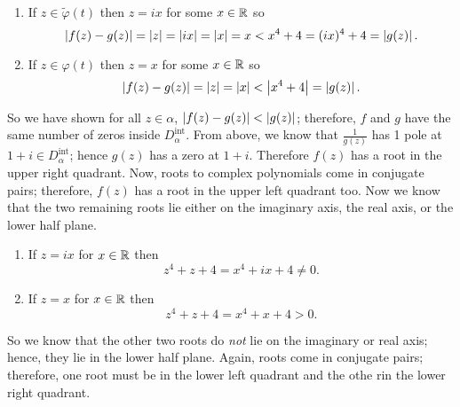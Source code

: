\begin{parts}
\begin{solution}
\begin{enumerate}
            \item
                If $z \in \tilde\varphi(t)$ 
                then $z = ix$ for some $x \in \mathbb{R}$
                so
                \[
                    \left\lvert f(z) - g(z)\right\rvert
                    = \left\lvert z\right\rvert 
                    = \left\lvert ix\right\rvert 
                    = \left\lvert x\right\rvert 
                    = x 
                    < x^4 + 4 
                    = (ix)^4 + 4
                    = \left\lvert g(z)\right\rvert.
                \]

            \item 
                If $z \in \varphi(t)$
                then $z = x$ for some $x \in \mathbb{R}$
                so
                \[
                    \left\lvert f(z) - g(z)\right\rvert
                    = \left\lvert z\right\rvert
                    = \left\lvert x\right\rvert
                    < \left\lvert x^4 + 4\right\rvert
                    = \left\lvert g(z)\right\rvert.
                \]
        \end{enumerate}
        So we have shown for all $z \in \alpha$,
        $\left\lvert f(z) - g(z)\right\rvert < \left\lvert g(z)\right\rvert$;
        therefore, $f$ and $g$ have the same number of zeros inside
        $D_\alpha^{\text{int}}$.
        From above, we know that $\frac1{g(z)}$ has 1 pole
        at $1 + i \in D_\alpha^{\text{int}}$;
        hence $g(z)$ has a zero at $1 + i$.
        Therefore $f(z)$ has a root in the upper right quadrant.
        Now, roots to complex polynomials come in conjugate pairs;
        therefore, $f(z)$ has a root in the upper left quadrant too.
        Now we know that the two remaining roots
        lie either on the imaginary axis, the real axis, or the lower half plane.
        \begin{enumerate}
            \item 
                If $z = ix$ for $x \in \mathbb{R}$
                then
                \[
                    z^4 + z + 4
                    = x^4 + ix + 4
                    \neq 0.
                \]

            \item 
                If $z = x$ for $x \in \mathbb{R}$
                then
                \[
                    z^4 + z + 4
                    = x^4 + x + 4
                    > 0.
                \]
        \end{enumerate}
        So we know that the other two roots do \emph{not}
        lie on the imaginary or real axis;
        hence, they lie in the lower half plane.
        Again, roots come in conjugate pairs;
        therefore, one root must be in the 
        lower left quadrant
        and the othe rin the
        lower right quadrant.
    \end{solution}


\end{parts}
